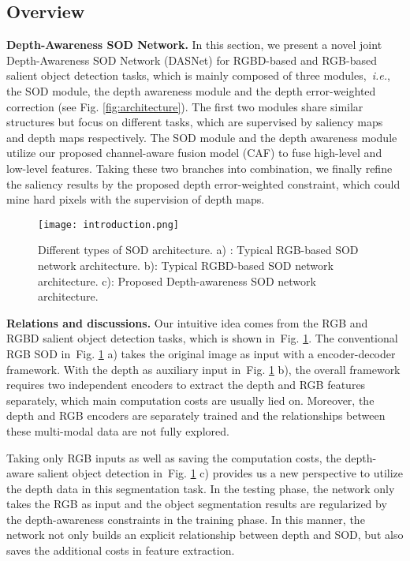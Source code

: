 \documentclass[sigconf]{acmart}
\def\ie{{\em i.e.}}
\newcommand{\figref}[1]{Fig. \ref{#1}}
\begin{document}
\subsection{Overview}

\textbf{Depth-Awareness SOD Network.} 
In this section, we present a novel joint Depth-Awareness SOD Network (DASNet) for RGBD-based and RGB-based salient object detection tasks, which is mainly composed of three modules,~\ie, the SOD module, the depth awareness module and the depth error-weighted correction (see \figref{fig:architecture}). The first two modules share similar structures but focus on different tasks, which are supervised by saliency maps and depth maps respectively. The SOD module and the depth awareness module utilize our proposed channel-aware fusion model (CAF) to fuse high-level and low-level features. Taking these two branches into combination, we finally refine the saliency results by the proposed depth error-weighted constraint, which could mine hard pixels with the supervision of depth maps.


\begin{figure}
	\begin{center}
\texttt{[image: introduction.png]}
		\caption{Different types of SOD architecture. a) :  Typical RGB-based SOD network architecture. b): Typical RGBD-based SOD network architecture. c): Proposed Depth-awareness SOD network architecture.
		}\label{fig:introduction}
	\end{center}
\end{figure}

\textbf{Relations and discussions.}
Our intuitive idea comes from the RGB and RGBD salient object detection tasks, which is shown in~\figref{fig:introduction}. The conventional RGB SOD in~\figref{fig:introduction} a) takes the original image as input with a encoder-decoder framework. With the depth as auxiliary input in~\figref{fig:introduction} b), the overall framework requires two independent encoders to extract the depth and RGB features separately, which main computation costs are usually lied on. Moreover, the depth and RGB encoders are separately trained and the relationships between these multi-modal data are not fully explored. 

Taking only RGB inputs as well as saving the computation costs, the depth-aware salient object detection in~\figref{fig:introduction} c) provides us a new perspective to utilize the depth data in this segmentation task. In the testing phase, the network only takes the RGB as input and the object segmentation results are regularized by the depth-awareness constraints in the training phase. In this manner, the network not only builds an explicit relationship between depth and SOD, but also saves the additional costs in feature extraction.
\end{document}

